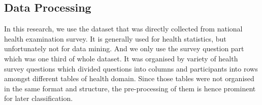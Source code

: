 \documentclass[12pt]{article}
\begin{document}
\subsection{Data Processing}

In this research, we use the dataset that was directly collected from national health examination survey. It is generally used for health statistics, but unfortunately not for data mining. And we only use the survey question part which was one third of whole dataset. It was organised by variety of health survey questions which divided questions into columns and participants into rows amongst different tables of health domain. Since those tables were not organised in the same format and structure, the pre-processing of them is hence prominent for later classification. 
\\
\end{document}
